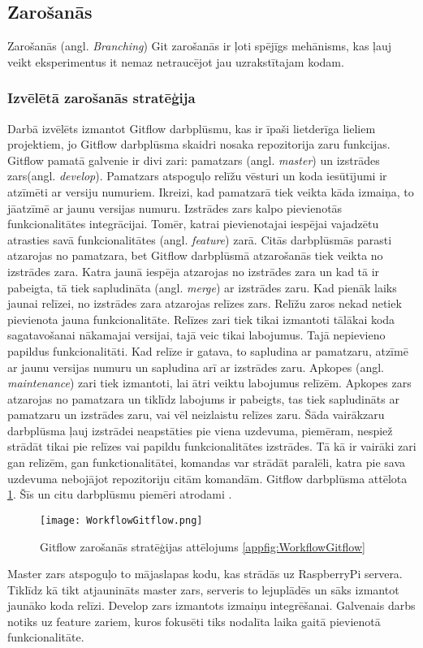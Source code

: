 \subsection{Zarošanās}
Zarošanās (angl. \textit{Branching})
Git zarošanās ir ļoti spējīgs mehānisms, kas ļauj veikt eksperimentus it nemaz netraucējot jau uzrakstītajam kodam.
\subsubsection{Izvēlētā zarošanās stratēģija}
Darbā izvēlēts izmantot Gitflow darbplūsmu, kas ir īpaši lietderīga lieliem projektiem, jo Gitflow darbplūsma skaidri nosaka repozitorija zaru funkcijas. Gitflow pamatā galvenie ir divi zari: pamatzars (angl. \textit{master}) un izstrādes zars(angl. \textit{develop}). Pamatzars atspoguļo relīžu vēsturi un koda iesūtījumi ir atzīmēti ar versiju numuriem. Ikreizi, kad pamatzarā tiek veikta kāda izmaiņa, to jāatzīmē ar jaunu versijas numuru. Izstrādes zars kalpo pievienotās funkcionalitātes integrācijai. Tomēr, katrai pievienotajai iespējai vajadzētu atrasties savā funkcionalitātes (angl. \textit{feature}) zarā. Citās darbplūsmās parasti atzarojas no pamatzara, bet Gitflow darbplūsmā atzarošanās tiek veikta no izstrādes zara. Katra jaunā iespēja atzarojas no izstrādes zara un kad tā ir pabeigta, tā tiek sapludināta (angl. \textit{merge}) ar izstrādes zaru.
Kad pienāk laiks jaunai relīzei, no izstrādes zara atzarojas relīzes zars. Relīžu zaros nekad netiek pievienota jauna funkcionalitāte. Relīzes zari tiek tikai izmantoti tālākai koda sagatavošanai nākamajai versijai, tajā veic tikai labojumus. Tajā nepievieno papildus funkcionalitāti. Kad relīze ir gatava, to sapludina ar pamatzaru, atzīmē ar jaunu versijas numuru un sapludina arī ar izstrādes zaru.
Apkopes (angl. \textit{maintenance}) zari tiek izmantoti, lai ātri veiktu labojumus relīzēm. Apkopes zars atzarojas no pamatzara un tiklīdz labojums ir pabeigts, tas tiek sapludināts ar pamatzaru un izstrādes zaru, vai vēl neizlaistu relīzes zaru.
Šāda vairākzaru darbplūsma ļauj izstrādei neapstāties pie viena uzdevuma, piemēram, nespiež strādāt tikai pie relīzes vai papildu funkcionalitātes izstrādes. Tā kā ir vairāki zari gan relīzēm, gan funkctionalitātei, komandas var strādāt paralēli, katra pie sava uzdevuma nebojājot repozitoriju citām komandām.
Gitflow darbplūsma attēlota \ref{fig:WorkflowGitflow}. Šīs un citu darbplūsmu piemēri atrodami \cite{workflow-comparison}.
\begin{figure}[H]%
	\centering
	\captionsetup{justification=centering}
	\texttt{[image: WorkflowGitflow.png]}
	\caption{Gitflow zarošanās stratēģijas attēlojums \ref{appfig:WorkflowGitflow}}
	\label{fig:WorkflowGitflow}
\end{figure}
Master zars atspoguļo to mājaslapas kodu, kas strādās uz RaspberryPi servera. Tiklīdz kā tikt atjaunināts master zars, serveris to lejuplādēs un sāks izmantot jaunāko koda relīzi.
Develop zars izmantots izmaiņu integrēšanai.
Galvenais darbs notiks uz feature zariem, kuros fokusēti tiks nodalīta laika gaitā pievienotā funkcionalitāte.




